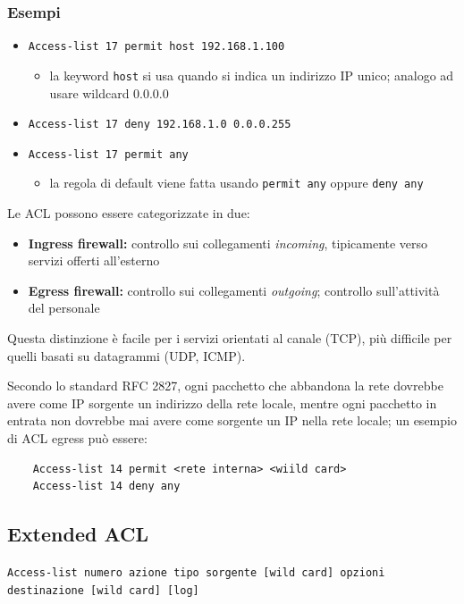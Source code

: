 \subsubsection{Esempi}
\begin{itemize}
    \item \texttt{Access-list 17 permit host 192.168.1.100}
    \begin{itemize}
        \item la keyword \texttt{host} si usa quando si indica un indirizzo IP unico; analogo 
        ad usare wildcard 0.0.0.0
    \end{itemize}
    \item \texttt{Access-list 17 deny 192.168.1.0 0.0.0.255}
    \item \texttt{Access-list 17 permit any}
    \begin{itemize}
        \item la regola di default viene fatta usando \texttt{permit any} oppure \texttt{deny any}
    \end{itemize}
\end{itemize}

\noindent Le ACL possono essere categorizzate in due:
\begin{itemize}
    \item \textbf{Ingress firewall:} controllo sui collegamenti \textit{incoming}, tipicamente verso 
    servizi offerti all'esterno
    \item \textbf{Egress firewall:} controllo sui collegamenti \textit{outgoing}; controllo sull'attività del personale
\end{itemize}

\noindent Questa distinzione è facile per i servizi orientati al canale (TCP), più difficile 
per quelli basati su datagrammi (UDP, ICMP).

\noindent Secondo lo standard RFC 2827, ogni pacchetto che abbandona la rete dovrebbe avere come IP sorgente 
un indirizzo della rete locale, mentre ogni pacchetto in entrata non dovrebbe mai avere come sorgente 
un IP nella rete locale; un esempio di ACL egress può essere:

\begin{lstlisting}
    Access-list 14 permit <rete interna> <wiild card>
    Access-list 14 deny any
\end{lstlisting}

\subsection{Extended ACL}
\begin{center}
    \texttt{Access-list numero azione tipo sorgente [wild card] opzioni
    destinazione [wild card] [log]}
\end{center}

